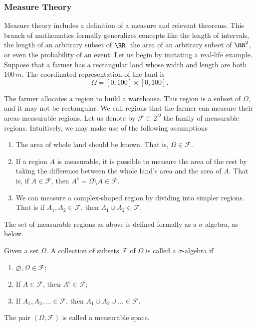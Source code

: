 \subsubsection{Measure Theory}
Measure theory includes a definition of a measure and relevant theorems. This branch of mathematics formally generalizes concepts like the length of intervals, the length of an arbitrary subset of $\RR$, the area of an arbitrary subset of $\RR^2$, or even the probability of an event. Let us begin by imitating a real-life example. Suppose that a farmer has a rectangular land whose width and length are both $100\,m$. The coordinated representation of the land is
$$\Omega=[0,100]\times[0,100].$$

The farmer allocates a region to build a warehouse. This region is a subset of $\Omega$, and it may not be rectangular. We call regions that the farmer can measure their areas measurable regions. Let us denote by $\mathcal{F}\subset 2^\Omega$ the family of measurable regions. Intuitively, we may make use of the following assumptions

\begin{enumerate}
    \item The area of whole land should be known. That is, $\Omega\in\mathcal{F}.$
    \item If a region $A$ is measurable, it is possible to measure the area of the rest by taking the difference between the whole land's area and the area of $A$. That is, if $A\in\mathcal{F}$, then $A^c=\Omega\setminus A\in\mathcal{F}$.
    \item We can measure a complex-shaped region by dividing into simpler regions. That is if $A_1,A_2\in\mathcal{F}$, then $A_1\cup A_2\in\mathcal{F}$.
\end{enumerate}

The set of measurable regions as above is defined formally as a $\sigma$-algebra, as below.

\begin{definition}
    \label{definition:sigma-algebra}
    Given a set $\Omega$. A collection of subsets $\mathcal{F}$ of $\Omega$ is called a $\sigma$-algebra if
    \begin{enumerate}
        \item $\varnothing, \Omega\in\mathcal{F}$;
        \item If $A\in\mathcal{F}$, then $A^c\in\mathcal{F}$;
        \item If $A_1,A_2,...\in\mathcal{F}$, then $A_1\cup A_2\cup...\in\mathcal{F}$.
    \end{enumerate}
    The pair $(\Omega, \mathcal{F})$ is called a measurable space.
\end{definition}

